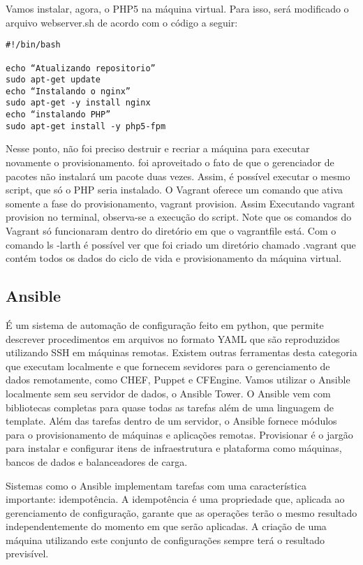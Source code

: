 Vamos instalar, agora, o PHP5 na máquina virtual. Para isso, 
será modificado o arquivo webserver.sh de acordo com o código
a seguir:
\begin{lstlisting}
#!/bin/bash

echo “Atualizando repositorio”
sudo apt-get update
echo “Instalando o nginx”
sudo apt-get -y install nginx
echo “instalando PHP”
sudo apt-get install -y php5-fpm
\end{lstlisting}
Nesse ponto, não foi preciso destruir e recriar a máquina para 
executar novamente o provisionamento. foi aproveitado o fato 
de que o gerenciador de pacotes não instalará um pacote duas 
vezes. Assim, é possível executar o mesmo script, que só o PHP 
seria instalado. O Vagrant oferece um comando que ativa somente 
a fase do provisionamento, vagrant provision. Assim Executando 
vagrant provision no terminal, observa-se a execução do script. 
Note que os comandos do Vagrant só funcionaram dentro 
do diretório em que o vagrantfile está. 
Com o comando ls -larth é possível ver que foi criado um diretório 
chamado .vagrant que contém todos os dados do ciclo de vida e 
provisionamento da máquina virtual.

\subsection{Ansible}

É um sistema de automação de configuração feito em python, 
que permite descrever procedimentos em arquivos no formato 
YAML que são reproduzidos utilizando SSH em máquinas remotas. 
Existem outras ferramentas desta categoria que executam 
localmente e que fornecem sevidores para o gerenciamento de 
dados remotamente, como CHEF, Puppet e CFEngine. Vamos utilizar 
o Ansible localmente sem seu servidor de dados, o Ansible Tower.
O Ansible vem com bibliotecas completas para quase todas as 
tarefas além de uma linguagem de template. Além das tarefas 
dentro de um servidor, o Ansible fornece módulos para o 
provisionamento de máquinas e aplicações remotas. 
Provisionar é o jargão para instalar e configurar itens de 
infraestrutura e plataforma como máquinas, bancos de dados 
e balanceadores de carga.

Sistemas como o Ansible implementam tarefas com uma 
característica importante: idempotência. A idempotência é 
uma propriedade que, aplicada ao gerenciamento de configuração, 
garante	que as operações terão o mesmo resultado independentemente 
do momento em que serão aplicadas. A criação de uma máquina 
utilizando este conjunto de configurações sempre terá o 
resultado previsível.

